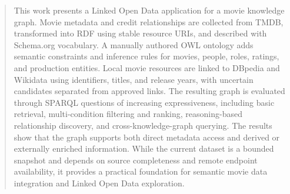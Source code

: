 \begin{abstract}
    This work presents a Linked Open Data application for a movie knowledge
    graph. Movie metadata and credit relationships are collected from TMDB,
    transformed into RDF using stable resource URIs, and described with
    Schema.org vocabulary. A manually authored OWL ontology adds semantic
    constraints and inference rules for movies, people, roles, ratings, and
    production entities. Local movie resources are linked to DBpedia and
    Wikidata using identifiers, titles, and release years, with uncertain
    candidates separated from approved links. The resulting graph is
    evaluated through SPARQL questions of increasing expressiveness,
    including basic retrieval, multi-condition filtering and ranking,
    reasoning-based relationship discovery, and cross-knowledge-graph
    querying. The results show that the graph supports both direct metadata
    access and derived or externally enriched information. While the current
    dataset is a bounded snapshot and depends on source completeness and
    remote endpoint availability, it provides a practical foundation for
    semantic movie data integration and Linked Open Data exploration.
\end{abstract}